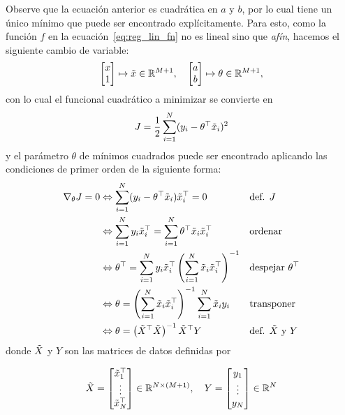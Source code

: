 Observe que la ecuación anterior es cuadrática en $a$ y $b$, por lo cual tiene un único mínimo que puede ser encontrado explícitamente. Para esto, como la función $f$ en la ecuación~\eqref{eq:reg_lin_fn} no es lineal sino que \emph{afín}, hacemos el siguiente cambio de variable:
\begin{equation}
  \left[ \begin{matrix}x \\  1\end{matrix}\right] \mapsto \tilde{x}\in{\mathbb R}^{M+1},\quad
  \left[ \begin{matrix}a \\  b\end{matrix}\right]\mapsto \theta\in{\mathbb R}^{M+1},
 \label{eq:truco_reg_lin} 
\end{equation}
con lo cual el funcional cuadrático a minimizar se convierte en
\begin{equation}
	J = \frac{1}{2}\sum_{i=1}^N(y_i-\theta^
	\top \tilde{x}_i)^2
	\label{eq:lin_least_squares2}
\end{equation} 
y el parámetro $\theta$ de mínimos cuadrados puede ser encontrado aplicando las condiciones de primer orden de la siguiente forma:
\begin{align}
\nabla_\theta J=0 &\Leftrightarrow \sum_{i=1}^N(y_i-\theta^\top \tilde{x}_i)\tilde{x}_i^\top=0  							&&\text{def. $J$}\nonumber\\  
&\Leftrightarrow \sum_{i=1}^Ny_i\tilde{x}_i^\top = \sum_{i=1}^N\theta^\top \tilde{x}_i\tilde{x}_i^\top					&&\text{ordenar}\nonumber\\
&\Leftrightarrow \theta^\top = \sum_{i=1}^Ny_i\tilde{x}_i^\top \left(\sum_{i=1}^N \tilde{x}_i\tilde{x}_i^\top\right)^{-1}	&&\text{despejar $\theta^\top$}\nonumber\\
&\Leftrightarrow \theta =  \left(\sum_{i=1}^N \tilde{x}_i\tilde{x}_i^\top\right)^{-1} \sum_{i=1}^N \tilde{x}_i y_i 		&&\text{transponer}\nonumber\\
&\Leftrightarrow \theta = \left(\tilde{X}^\top\tilde{X} \right)^{-1} \tilde{X}^\top Y 											&&\text{def. $\tilde{X}$ y $Y$} \label{eq:sol_mse}
\end{align}
donde $\tilde{X}$ y $Y$ son las matrices de datos definidas por

\begin{equation}
  \tilde{X} = \left[ \begin{matrix}\tilde{x}_1^\top \\\vdots \\ \tilde{x}_N^\top \end{matrix}\right]\in{\mathbb R}^{N\times (M+1)} ,\quad
  Y = \left[ \begin{matrix}y_1 \\\vdots \\y_N \end{matrix}\right] \in{\mathbb R}^{N}
 \label{eq:matrices_X} 
\end{equation}

